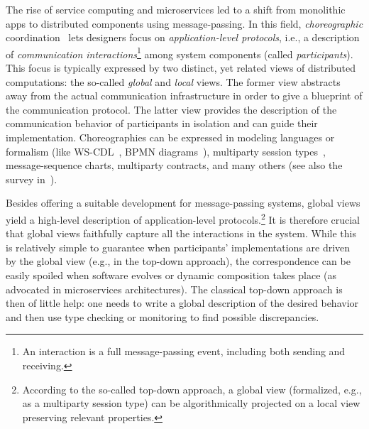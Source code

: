 The rise of service computing and microservices led to a shift from  
monolithic apps to distributed components using message-passing.  
%  
In this field, \emph{choreographic} coordination~\cite{WS-CDL} lets  
designers focus on \emph{application-level protocols}, i.e., a  
description of \emph{communication interactions}\footnote{%
  An interaction is a full message-passing event, including both  
  sending and receiving.} among system components (called  
\emph{participants}).
%
This focus is typically expressed by two distinct, yet related views
of distributed computations: the so-called \emph{global} and
\emph{local} views.
%
The former view abstracts away from the actual communication
infrastructure in order to give a blueprint of the communication
protocol.
%
The latter view provides the description of the communication
behavior of participants in isolation and can guide their
implementation.
Choreographies can be expressed in modeling languages or formalism
(like WS-CDL~\cite{WS-CDL}, BPMN diagrams~\cite{BPMN}),
multiparty session types~\cite{HondaYC16}, message-sequence charts,
multiparty contracts, and many others (see also the survey
in~\cite{Huttel+16}).

Besides offering a suitable development for message-passing systems,
global views yield a high-level description of application-level
protocols.\footnote{According to the so-called top-down approach, a
  global view (formalized, e.g., as a multiparty session type) can be
  algorithmically projected on a local view preserving relevant
  properties.}
%
It is therefore crucial that global views faithfully capture
all the interactions in the system.
%
While this is relatively simple to guarantee when participants'
implementations are driven by the global view (e.g., in the top-down
approach), the correspondence can be easily spoiled when software
evolves or dynamic  composition  takes place (as advocated in
microservices architectures).
%
The classical top-down approach is then of little help: one needs to
write a global description of the desired behavior and then use type
checking or monitoring to find possible discrepancies.

